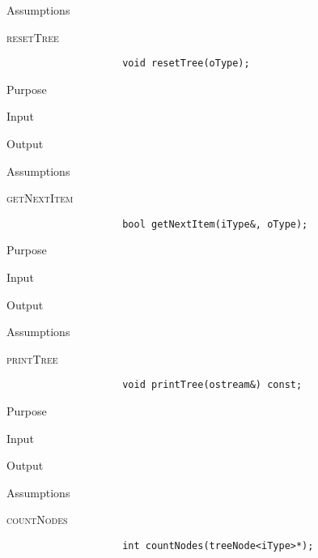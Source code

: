 \documentclass[pdftex, 12pt]{article}
\begin{document}
\begin{description}
\begin{description}
\begin{description}
\begin{description}
					\item{Assumptions}

				\end{description}
			\item{\textsc{resetTree}}
				\begin{lstlisting}
					void resetTree(oType);
				\end{lstlisting}
				\begin{description}

					\item{Purpose}

					\item{Input}

					\item{Output}

					\item{Assumptions}

				\end{description}
			\item{\textsc{getNextItem}}
				\begin{lstlisting}
					bool getNextItem(iType&, oType);
				\end{lstlisting}
				\begin{description}

					\item{Purpose}

					\item{Input}

					\item{Output}

					\item{Assumptions}

				\end{description}
			\item{\textsc{printTree}}
				\begin{lstlisting}
					void printTree(ostream&) const;
				\end{lstlisting}
				\begin{description}

					\item{Purpose}

					\item{Input}

					\item{Output}

					\item{Assumptions}

				\end{description}
			\item{\textsc{countNodes}}
				\begin{lstlisting}
					int countNodes(treeNode<iType>*);
				\end{lstlisting}
				\begin{description}


\end{description}
\end{description}
\end{description}
\end{description}
\end{document}
